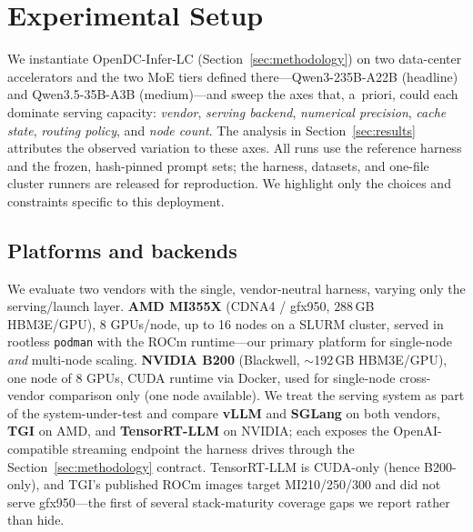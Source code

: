 
\section{Experimental Setup}
\label{sec:experiments}

We instantiate OpenDC-Infer-LC (Section~\ref{sec:methodology}) on two data-center
accelerators and the two MoE tiers defined there---Qwen3-235B-A22B (headline) and
Qwen3.5-35B-A3B (medium)---and sweep the axes that, a~priori, could each dominate
serving capacity: \emph{vendor}, \emph{serving backend}, \emph{numerical
precision}, \emph{cache state}, \emph{routing policy}, and \emph{node count}. The
analysis in Section~\ref{sec:results} attributes the observed variation to these
axes. All runs use the reference harness and the frozen, hash-pinned prompt sets;
the harness, datasets, and one-file cluster runners are released for reproduction.
We highlight only the choices and constraints specific to this deployment.

\subsection{Platforms and backends}
We evaluate two vendors with the single, vendor-neutral harness, varying only the
serving/launch layer. \textbf{AMD MI355X} (CDNA4 / gfx950, $288$\,GB HBM3E/GPU),
8 GPUs/node, up to 16 nodes on a SLURM cluster, served in rootless \texttt{podman}
with the ROCm runtime---our primary platform for single-node \emph{and} multi-node
scaling. \textbf{NVIDIA B200} (Blackwell, $\sim$192\,GB HBM3E/GPU), one node of
8 GPUs, CUDA runtime via Docker, used for single-node cross-vendor comparison only
(one node available). We treat the serving system as part of the system-under-test
and compare \textbf{vLLM} and \textbf{SGLang} on both vendors, \textbf{TGI} on AMD,
and \textbf{TensorRT-LLM} on NVIDIA; each exposes the OpenAI-compatible streaming
endpoint the harness drives through the Section~\ref{sec:methodology} contract.
TensorRT-LLM is CUDA-only (hence B200-only), and TGI's published ROCm images target
MI210/250/300 and did not serve gfx950---the first of several stack-maturity
coverage gaps we report rather than hide.

